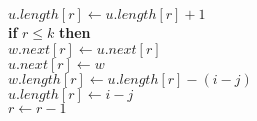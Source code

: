 \documentclass{beamer}
\begin{document}
\begin{frame}[shrink]
\begin{oframed}
\begin{flushleft}
\hspace*{1em} \hspace*{1em} \hspace*{1em} \ensuremath{\ensuremath{\mathit{u}}.\ensuremath{\ensuremath{\mathit{length}}[\ensuremath{\mathit{r}}]} \gets  \ensuremath{\ensuremath{\mathit{u}}.\ensuremath{\mathit{length}}[\ensuremath{\mathit{r}}] + 1}}\\
\hspace*{1em} \hspace*{1em} \hspace*{1em} {\color{black} \textbf{if}} \ensuremath{\ensuremath{\mathit{r}} \le k} {\color{black} \textbf{then}} \\
\hspace*{1em} \hspace*{1em} \hspace*{1em} \hspace*{1em} \ensuremath{\ensuremath{\mathit{w}}.\ensuremath{\ensuremath{\mathit{next}}[\ensuremath{\mathit{r}}]} \gets  \ensuremath{\ensuremath{\mathit{u}}.\ensuremath{\mathit{next}}[\ensuremath{\mathit{r}}]}}\\
\hspace*{1em} \hspace*{1em} \hspace*{1em} \hspace*{1em} \ensuremath{\ensuremath{\mathit{u}}.\ensuremath{\ensuremath{\mathit{next}}[\ensuremath{\mathit{r}}]} \gets  \ensuremath{w}}\\
\hspace*{1em} \hspace*{1em} \hspace*{1em} \hspace*{1em} \ensuremath{\ensuremath{\mathit{w}}.\ensuremath{\ensuremath{\mathit{length}}[\ensuremath{\mathit{r}}]} \gets  \ensuremath{\ensuremath{\mathit{u}}.\ensuremath{\mathit{length}}[\ensuremath{\mathit{r}}] - (\ensuremath{\mathit{i}}-\ensuremath{\mathit{j}})}}\\
\hspace*{1em} \hspace*{1em} \hspace*{1em} \hspace*{1em} \ensuremath{\ensuremath{\mathit{u}}.\ensuremath{\ensuremath{\mathit{length}}[\ensuremath{\mathit{r}}]} \gets  \ensuremath{\ensuremath{\mathit{i}} - j}}\\
\hspace*{1em} \hspace*{1em} \hspace*{1em} \ensuremath{\ensuremath{\mathit{r}} \gets  \ensuremath{\ensuremath{\mathit{r}} - 1}}\\

\end{flushleft}
\end{oframed}
\end{frame}
\end{document}
